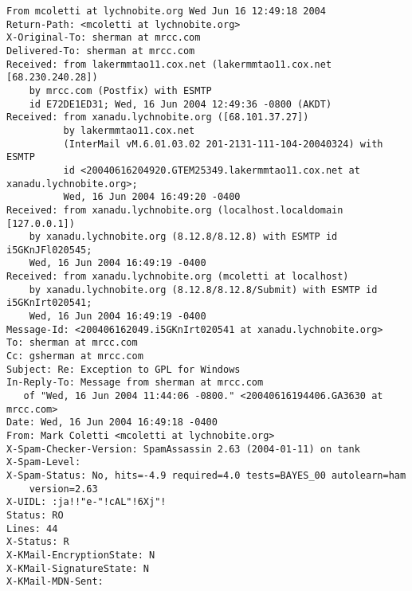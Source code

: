 \begin{small}
\begin{verbatim}
From mcoletti at lychnobite.org Wed Jun 16 12:49:18 2004
Return-Path: <mcoletti at lychnobite.org>
X-Original-To: sherman at mrcc.com
Delivered-To: sherman at mrcc.com
Received: from lakermmtao11.cox.net (lakermmtao11.cox.net [68.230.240.28])
	by mrcc.com (Postfix) with ESMTP
	id E72DE1ED31; Wed, 16 Jun 2004 12:49:36 -0800 (AKDT)
Received: from xanadu.lychnobite.org ([68.101.37.27])
          by lakermmtao11.cox.net
          (InterMail vM.6.01.03.02 201-2131-111-104-20040324) with ESMTP
          id <20040616204920.GTEM25349.lakermmtao11.cox.net at xanadu.lychnobite.org>;
          Wed, 16 Jun 2004 16:49:20 -0400
Received: from xanadu.lychnobite.org (localhost.localdomain [127.0.0.1])
	by xanadu.lychnobite.org (8.12.8/8.12.8) with ESMTP id i5GKnJFl020545;
	Wed, 16 Jun 2004 16:49:19 -0400
Received: from xanadu.lychnobite.org (mcoletti at localhost)
	by xanadu.lychnobite.org (8.12.8/8.12.8/Submit) with ESMTP id i5GKnIrt020541;
	Wed, 16 Jun 2004 16:49:19 -0400
Message-Id: <200406162049.i5GKnIrt020541 at xanadu.lychnobite.org>
To: sherman at mrcc.com
Cc: gsherman at mrcc.com
Subject: Re: Exception to GPL for Windows 
In-Reply-To: Message from sherman at mrcc.com 
   of "Wed, 16 Jun 2004 11:44:06 -0800." <20040616194406.GA3630 at mrcc.com> 
Date: Wed, 16 Jun 2004 16:49:18 -0400
From: Mark Coletti <mcoletti at lychnobite.org>
X-Spam-Checker-Version: SpamAssassin 2.63 (2004-01-11) on tank
X-Spam-Level: 
X-Spam-Status: No, hits=-4.9 required=4.0 tests=BAYES_00 autolearn=ham 
	version=2.63
X-UIDL: :ja!!"e-"!cAL"!6Xj"!
Status: RO
Lines: 44
X-Status: R
X-KMail-EncryptionState: N
X-KMail-SignatureState: N
X-KMail-MDN-Sent:  



\end{verbatim}
\end{small}
